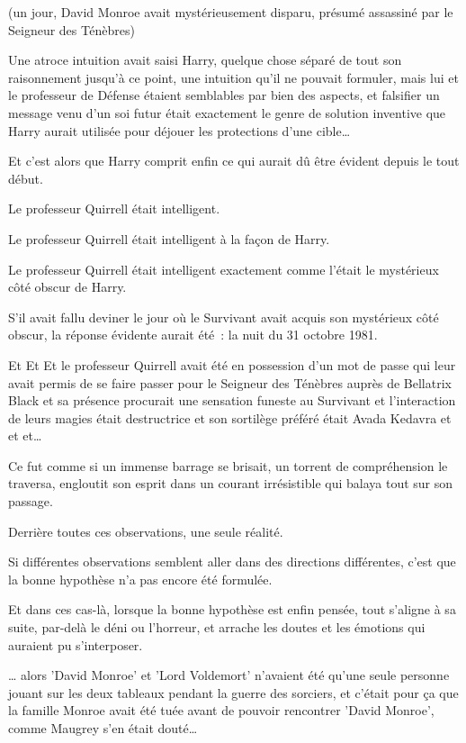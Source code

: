 (un jour, David Monroe avait mystérieusement disparu, présumé assassiné par le Seigneur des Ténèbres)

Une atroce intuition avait saisi Harry, quelque chose séparé de tout son raisonnement jusqu'à ce point, une intuition qu'il ne pouvait formuler, mais lui et le professeur de Défense étaient semblables par bien des aspects, et falsifier un message venu d'un soi futur était exactement le genre de solution inventive que Harry aurait utilisée pour déjouer les protections d'une cible…

Et c'est alors que Harry comprit enfin ce qui aurait dû être évident depuis le tout début.

\later

Le professeur Quirrell était intelligent.

Le professeur Quirrell était intelligent à la façon de Harry.

Le professeur Quirrell était intelligent exactement comme l'était le mystérieux côté obscur de Harry.

S'il avait fallu deviner le jour où le Survivant avait acquis son mystérieux côté obscur, la réponse évidente aurait été~: la nuit du 31 octobre 1981.

\later

Et Et Et le professeur Quirrell avait été en possession d'un mot de passe qui leur avait permis de se faire passer pour le Seigneur des Ténèbres auprès de Bellatrix Black et sa présence procurait une sensation funeste au Survivant et l'interaction de leurs magies était destructrice et son sortilège préféré était Avada Kedavra et et et…

Ce fut comme si un immense barrage se brisait, un torrent de compréhension le traversa, engloutit son esprit dans un courant irrésistible qui balaya tout sur son passage.

Derrière toutes ces observations, une seule réalité.

Si différentes observations semblent aller dans des directions différentes, c'est que la bonne hypothèse n'a pas encore été formulée.

Et dans ces cas-là, lorsque la bonne hypothèse est enfin pensée, tout s'aligne à sa suite, par-delà le déni ou l'horreur, et arrache les doutes et les émotions qui auraient pu s'interposer.

… alors 'David Monroe' et 'Lord Voldemort' n'avaient été qu'une seule personne jouant sur les deux tableaux pendant la guerre des sorciers, et c'était pour ça que la famille Monroe avait été tuée avant de pouvoir rencontrer 'David Monroe', comme Maugrey s'en était douté…

